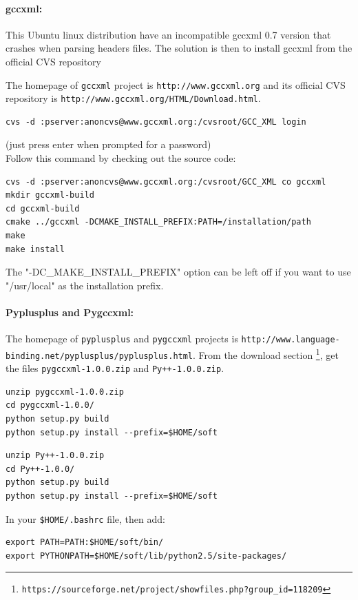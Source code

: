 \documentclass[12pt,a4paper]{article}
\begin{document}
\paragraph{gccxml:} This Ubuntu linux distribution have an incompatible gccxml 0.7 version that crashes when parsing headers files. The solution is then to install gccxml from the official CVS repository

The homepage of {\tt gccxml} project is {\tt http://www.gccxml.org} and its official 
CVS repository is {\tt http://www.gccxml.org/HTML/Download.html}.

\begin{verbatim}
cvs -d :pserver:anoncvs@www.gccxml.org:/cvsroot/GCC_XML login
\end{verbatim}
(just press enter when prompted for a password)\\
Follow this command by checking out the source code:
\begin{verbatim}
cvs -d :pserver:anoncvs@www.gccxml.org:/cvsroot/GCC_XML co gccxml
mkdir gccxml-build
cd gccxml-build
cmake ../gccxml -DCMAKE_INSTALL_PREFIX:PATH=/installation/path
make
make install
\end{verbatim}
The "-DC\_MAKE\_INSTALL\_PREFIX" option can be left off if you want to use "/usr/local" as the installation prefix.

\paragraph{Pyplusplus and Pygccxml: }
The homepage of {\tt pyplusplus} and {\tt pygccxml} projects is 
{\tt http://www.language-binding.net/pyplusplus/pyplusplus.html}. From the
download section \footnote{\tt https://sourceforge.net/project/showfiles.php?group\_id=118209}, 
get the files {\tt pygccxml-1.0.0.zip} and {\tt Py++-1.0.0.zip}.

\begin{verbatim}
unzip pygccxml-1.0.0.zip
cd pygccxml-1.0.0/
python setup.py build
python setup.py install --prefix=$HOME/soft
\end{verbatim}

\begin{verbatim}
unzip Py++-1.0.0.zip 
cd Py++-1.0.0/
python setup.py build
python setup.py install --prefix=$HOME/soft
\end{verbatim}

In your {\tt \$HOME/.bashrc} file, then add:
\begin{verbatim}
export PATH=PATH:$HOME/soft/bin/
export PYTHONPATH=$HOME/soft/lib/python2.5/site-packages/
\end{verbatim}
\end{document}
